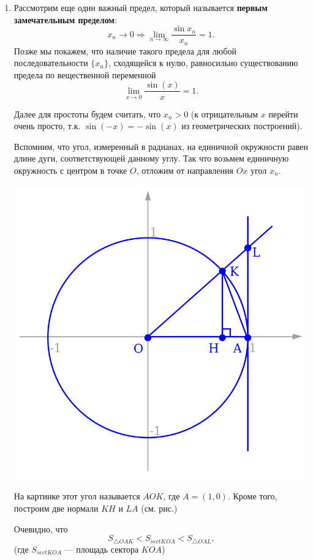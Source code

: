 \begin{enumerate}
\item Рассмотрим еще один важный предел, который называется \textbf{первым замечательным пределом}:
$$
x_n\to 0\Rightarrow \lim_{n\to\infty}\frac{\sin x_n}{x_n}=1.
$$
Позже мы покажем, что наличие такого предела для любой последовательности $\{x_n\}$, сходящейся к нулю, равносильно существованию предела по вещественной переменной
$$
\lim_{x\to 0}\frac{\sin(x)}{x}=1.
$$

Далее для простоты будем считать, что $x_n>0$ (к отрицательным $x$ перейти очень просто, т.к. $\sin(-x)=-\sin(x)$ из геометрических построений).

Вспомним, что угол, измеренный в радианах, на единичной окружности равен длине дуги, соответствующей данному углу. Так что возьмем единичную окружность с центром в точке $O$, отложим от направления $Ox$ угол $x_n$.
\begin{center}
\includegraphics[scale=0.3]{sinx.png}
\end{center}
На картинке этот угол называется $AOK$, где $A=(1,0)$. Кроме того, построим две нормали $KH$ и $LA$ (см. рис.)

Очевидно, что
\begin{equation}\label{SSS}
S_{\triangle OAK} < S_{sect KOA} < S_{\triangle OAL}.
\end{equation}
(где $S_{sect KOA}$ --- площадь сектора $KOA$)


\end{enumerate}
